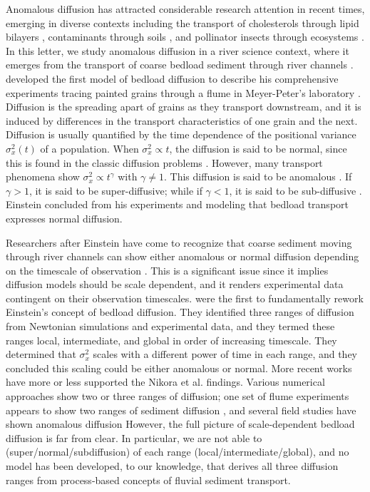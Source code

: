 \documentclass[]{agujournal2018}
\begin{document}
Anomalous diffusion has attracted considerable research attention in recent times, emerging in diverse contexts including the transport of cholesterols through lipid bilayers \citep{Jeon2012,Molina-Garcia2018}, contaminants through soils \citep{Berkowitz2006,Yang2019}, and pollinator insects through ecosystems \citep{Reynolds2009,Vallaeys2017}.
In this letter, we study anomalous diffusion in a river science context, where it emerges from the transport of coarse bedload sediment through river channels \citep{Bradley2017,Martin2012}.
\citet{Einstein1937} developed the first model of bedload diffusion to describe his comprehensive experiments tracing painted grains through a flume in Meyer-Peter's laboratory \citep{Ettema2004}.
Diffusion is the spreading apart of grains as they transport downstream, and it is induced by differences in the transport characteristics of one grain and the next. Diffusion is usually quantified by the time dependence of the positional variance $\sigma_x^2(t)$ of a population.
When $\sigma_x^2 \propto t$, the diffusion is said to be normal, since this is found in the classic diffusion problems \citep[e.g.][]{Einstein1905,Taylor1920}.
However, many transport phenomena show $\sigma_x^2 \propto t^\gamma$ with $\gamma \neq 1$. This diffusion is said to be anomalous \citep{Sokolov2012}. If $\gamma>1$, it is said to be super-diffusive; while if $\gamma <1$, it is said to be sub-diffusive \citep{Metzler2000}.
Einstein concluded from his experiments and modeling that bedload transport expresses normal diffusion.

Researchers after Einstein have come to recognize that coarse sediment moving through river channels can show either anomalous or normal diffusion depending on the timescale of observation \citep{Nikora2002}.
This is a significant issue since it implies diffusion models should be scale dependent, and it renders experimental data contingent on their observation timescales.
\citet{Nikora2001a,Nikora2002} were the first to fundamentally rework Einstein's concept of bedload diffusion.
They identified three ranges of diffusion from Newtonian simulations and experimental data, and they termed these ranges local, intermediate, and global in order of increasing timescale.
They determined that $\sigma_x^2$ scales with a different power of time in each range, and they concluded this scaling could be either anomalous or normal.
More recent works have more or less supported the Nikora et al. findings.
Various numerical approaches show two \citep[e.g.][]{Fan2016} or three \citep[e.g.][]{Bialik2012,Zhang2012} ranges of diffusion; one set of flume experiments appears to show two ranges of sediment diffusion \citep{Martin2012}, and several field studies have shown anomalous diffusion \citep{Bradley2017, Phillips2013}
However, the full picture of scale-dependent bedload diffusion is far from clear.
In particular, we are not able to (super/normal/subdiffusion) of each range (local/intermediate/global), and no model has been developed, to our knowledge, that derives all three diffusion ranges from process-based concepts of fluvial sediment transport.
\end{document}
